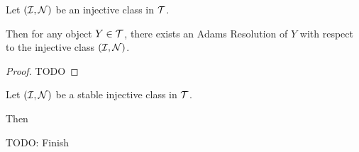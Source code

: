 \begin{theorem} %
    Let \( ({\mathcal{I}}, {\mathcal{N}}) \) be an injective class in \( {\mathcal{T}} \).

    Then for any object \( Y \in {\mathcal{T}} \), there exists an Adams Resolution of \( Y \) with respect to the injective class \( ({\mathcal{I}}, {\mathcal{N}}) \).
\end{theorem}
\begin{proof}
    TODO
\end{proof}

\begin{definition}
    Let \( ({\mathcal{I}}, {\mathcal{N}}) \) be a stable injective class in \( {\mathcal{T}} \).

    Then

    TODO: Finish
\end{definition}
